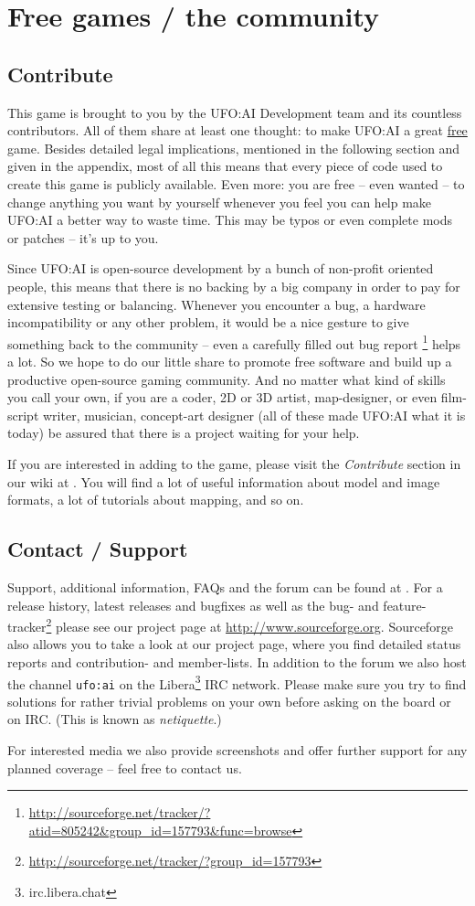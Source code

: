 \section{Free games / the community}
\subsection{Contribute}
This game is brought to you by the UFO:AI Development team and its countless contributors. All of them share at least one thought: to make UFO:AI a great \underline{free} game. Besides detailed legal implications, mentioned in the following section and given in the appendix, most of all this means that every piece of code used to create this game is publicly available. Even more: you are free -- even wanted -- to change anything you want by yourself whenever you feel you can help make UFO:AI a better way to waste time. This may be typos or even complete mods or patches -- it's up to you.

Since UFO:AI is open-source development by a bunch of non-profit oriented people, this means that there is no backing by a big company in order to pay for extensive testing or balancing. Whenever you encounter a bug, a hardware incompatibility or any other problem, it would be a nice gesture to give something back to the community -- even a carefully filled out bug report \footnote{\url{http://sourceforge.net/tracker/?atid=805242&group_id=157793&func=browse}} helps a lot. So we hope to do our little share to promote free software and build up a productive open-source gaming community. And no matter what kind of skills you call your own, if you are a coder, 2D or 3D artist, map-designer, or even film-script writer, musician, concept-art designer (all of these made UFO:AI what it is today) be assured that there is a project waiting for your help.

If you are interested in adding to the game, please visit the \textit{Contribute} section in our wiki at \ufohomepage. You will find a lot of useful information about model and image formats, a lot of tutorials about mapping, and so on.

\subsection{Contact / Support}
Support, additional information, FAQs and the forum can be found at \ufohomepage.
For a release history, latest releases and bugfixes as well as the bug- and feature-tracker\footnote{\url{http://sourceforge.net/tracker/?group_id=157793}} please see our project page at \url{http://www.sourceforge.org}. Sourceforge also allows you to take a look at our project page, where you find detailed status reports and contribution- and member-lists. In addition to the forum we also host the channel \texttt{ufo:ai} on the Libera\footnote{irc.libera.chat} IRC network. Please make sure you try to find solutions for rather trivial problems on your own before asking on the board or on IRC.  (This is known as \emph{netiquette}.)

For interested media we also provide screenshots and offer further support for any planned coverage -- feel free to contact us.
